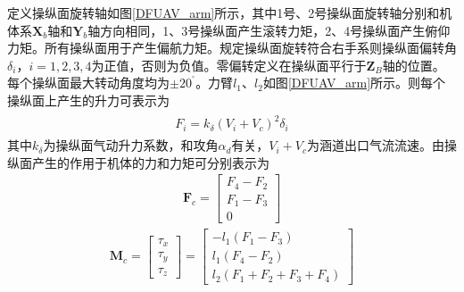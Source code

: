 定义操纵面旋转轴如图\ref{DFUAV_arm}所示，其中1号、2号操纵面旋转轴分别和机体系$ \bm{X}_b $轴和$ \bm{Y}_b $轴方向相同，1、3号操纵面产生滚转力矩，2、4号操纵面产生俯仰力矩。所有操纵面用于产生偏航力矩。规定操纵面旋转符合右手系则操纵面偏转角$\delta_i  $，$ i=1,2,3,4 $为正值，否则为负值。零偏转定义在操纵面平行于${{\bm{Z}}_{B}}$轴的位置。每个操纵面最大转动角度均为$\pm {{20}^{{}^\circ }}$。力臂${{l}_{1}}$、${{l}_{2}}$如图\ref{DFUAV_arm}所示。则每个操纵面上产生的升力可表示为\cite{Wu_2011,Zhao_2015,Graf_2008}
\begin{align}\begin{array}{l}
F_{i}=  k_{\delta} (V_i+V_c)^{2} \delta_{i} 
\end{array}	\label{F_i}
\end{align}
其中$  k_{\delta} $为操纵面气动升力系数，和攻角$ \alpha_d $有关，$ V_i+V_c $为涵道出口气流流速。由操纵面产生的作用于机体的力和力矩可分别表示为\cite{Pflimlin_2007a}
\begin{align}
\bm{F}_{c}=\begin{bmatrix}
F_4-F_2	\\
F_1-F_3 \\
0
\end{bmatrix}
\end{align}
\begin{align}\bm{M}_{c}=
\begin{bmatrix}
\tau_{x } \\
\tau_{y } \\
\tau_{z }
\end{bmatrix}
=
\begin{bmatrix}
-{{l}_{1}}\left(F_{1}-F_{3}\right) \\
{{l}_{1}}\left(F_{4}-F_{2}\right) \\
{{l}_{2}}\left(F_{1}+F_{2}+F_{3}+F_{4}\right)
\end{bmatrix}	\label{eq_M_c}
\end{align}
